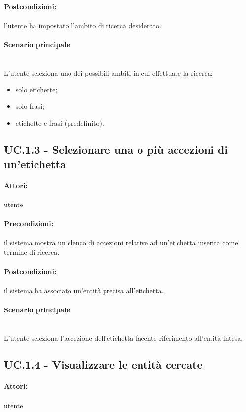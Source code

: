 \documentclass[10pt,a4paper,headinclude,footinclude,hidelinks]{scrreprt} %
\begin{document}
	\paragraph{Postcondizioni:} l'utente ha impostato l'ambito di ricerca desiderato.
	\paragraph{Scenario principale} \hfill \\
	L'utente seleziona uno dei possibili ambiti in cui effettuare la ricerca:
	\begin{itemize}
	\item solo etichette;
	\item solo frasi;
	\item etichette e frasi (predefinito).
	\end{itemize}

	\subsection[UC.1.3]{UC.1.3 - Selezionare una o più accezioni di un'etichetta}
	\label{ch:stage:ar:uc:1_3}
	\paragraph{Attori:} utente
	\paragraph{Precondizioni:} il sistema mostra un elenco di accezioni relative ad un'etichetta inserita come termine di ricerca.
	\paragraph{Postcondizioni:} il sistema ha associato un'entità precisa all'etichetta.
	\paragraph{Scenario principale}  \hfill \\
	L'utente seleziona l'accezione dell'etichetta facente riferimento all'entità intesa.

	\subsection[UC.1.4]{UC.1.4 - Visualizzare le entità cercate}
	\label{ch:stage:ar:uc:1_4}
	\paragraph{Attori:} utente
\end{document}
